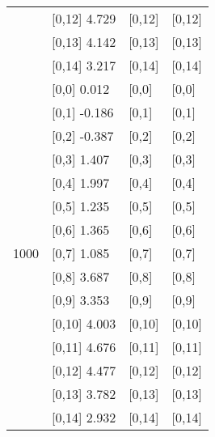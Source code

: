 \begin{table}
\begin{tabular}[t]{llll}
 & {}[0,12] 4.729 & {}[0,12] & {}[0,12]\\
 & {}[0,13] 4.142 & {}[0,13] & {}[0,13]\\
 & {}[0,14] 3.217 & {}[0,14] & {}[0,14]\\
\addlinespace
 & {}[0,0] 0.012 & {}[0,0] & {}[0,0]\\
 & {}[0,1] -0.186 & {}[0,1] & {}[0,1]\\
 & {}[0,2] -0.387 & {}[0,2] & {}[0,2]\\
 & {}[0,3] 1.407 & {}[0,3] & {}[0,3]\\
 & {}[0,4] 1.997 & {}[0,4] & {}[0,4]\\
\addlinespace
 & {}[0,5] 1.235 & {}[0,5] & {}[0,5]\\
 & {}[0,6] 1.365 & {}[0,6] & {}[0,6]\\
1000 & {}[0,7] 1.085 & {}[0,7] & {}[0,7]\\
 & {}[0,8] 3.687 & {}[0,8] & {}[0,8]\\
 & {}[0,9] 3.353 & {}[0,9] & {}[0,9]\\
\addlinespace
 & {}[0,10] 4.003 & {}[0,10] & {}[0,10]\\
 & {}[0,11] 4.676 & {}[0,11] & {}[0,11]\\
 & {}[0,12] 4.477 & {}[0,12] & {}[0,12]\\
 & {}[0,13] 3.782 & {}[0,13] & {}[0,13]\\
 & {}[0,14] 2.932 & {}[0,14] & {}[0,14]\\
\bottomrule
\end{tabular}
\end{table}
